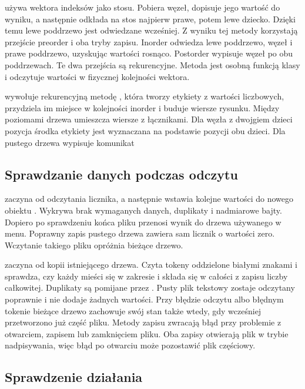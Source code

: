 używa wektora indeksów jako stosu.
Pobiera węzeł, dopisuje jego wartość do wyniku, a następnie
odkłada na stos najpierw prawe, potem lewe dziecko. Dzięki
temu lewe poddrzewo jest odwiedzane wcześniej. Z wyniku tej
metody korzystają przejście preorder i oba tryby zapisu.
Inorder odwiedza lewe poddrzewo, węzeł i prawe poddrzewo,
uzyskując wartości rosnąco. Postorder wypisuje węzeł po obu
poddrzewach. Te dwa przejścia są rekurencyjne. Metoda
 jest osobną funkcją klasy i odczytuje wartości
w fizycznej kolejności wektora.

 wywołuje rekurencyjną metodę ,
która tworzy etykiety z wartości liczbowych, przydziela im
miejsce w kolejności inorder i buduje wiersze rysunku. Między
poziomami drzewa umieszcza wiersze z łącznikami. Dla węzła
z dwojgiem dzieci pozycja środka etykiety jest wyznaczana
na podstawie pozycji obu dzieci. Dla pustego drzewa
 wypisuje komunikat 

\subsection{Sprawdzanie danych podczas odczytu}

 zaczyna od odczytania licznika, a następnie
wstawia kolejne wartości do nowego obiektu . Wykrywa
brak wymaganych danych, duplikaty i nadmiarowe bajty.
Dopiero po sprawdzeniu końca pliku przenosi wynik do drzewa
używanego w menu. Poprawny zapis pustego drzewa zawiera
sam licznik o wartości zero. Wczytanie takiego pliku
opróżnia bieżące drzewo.

 zaczyna od kopii istniejącego drzewa. Czyta
tokeny oddzielone białymi znakami i sprawdza, czy każdy mieści
się w zakresie  i składa się w całości z zapisu
liczby całkowitej. Duplikaty są pomijane przez .
Pusty plik tekstowy zostaje odczytany poprawnie i nie dodaje
żadnych wartości. Przy błędzie odczytu albo błędnym tokenie
bieżące drzewo zachowuje swój stan także wtedy, gdy wcześniej
przetworzono już część pliku. Metody zapisu zwracają błąd
przy problemie z otwarciem, zapisem lub zamknięciem pliku.
Oba zapisy otwierają plik w trybie nadpisywania, więc błąd po
otwarciu może pozostawić plik częściowy.

\subsection{Sprawdzenie działania}
\label{sec:testy}

